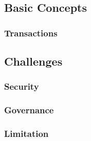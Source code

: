 \subsection{Basic Concepts}

\subsubsection{Transactions}


\subsection{Challenges}

\subsubsection{Security}
\subsubsection{Governance}
\subsubsection{Limitation}